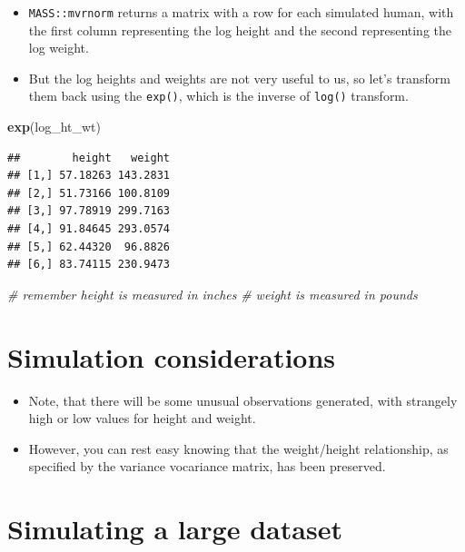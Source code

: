 \documentclass[
]{article}
\newenvironment{Shaded}{\begin{snugshade}}{\end{snugshade}}
\newcommand{\CommentTok}[1]{\textcolor[rgb]{0.56,0.35,0.01}{\textit{#1}}}
\newcommand{\FunctionTok}[1]{\textcolor[rgb]{0.13,0.29,0.53}{\textbf{#1}}}
\newcommand{\NormalTok}[1]{#1}
\providecommand{\tightlist}{%
  \setlength{\itemsep}{0pt}\setlength{\parskip}{0pt}}
\begin{document}
\begin{itemize}
\tightlist
\item
  \texttt{MASS::mvrnorm} returns a matrix with a row for each simulated
  human, with the first column representing the log height and the
  second representing the log weight.
\item
  But the log heights and weights are not very useful to us, so let's
  transform them back using the \texttt{exp()}, which is the inverse of
  \texttt{log()} transform.
\end{itemize}

\begin{Shaded}
\begin{Highlighting}[]
\FunctionTok{exp}\NormalTok{(log\_ht\_wt)}
\end{Highlighting}
\end{Shaded}

\begin{verbatim}
##        height   weight
## [1,] 57.18263 143.2831
## [2,] 51.73166 100.8109
## [3,] 97.78919 299.7163
## [4,] 91.84645 293.0574
## [5,] 62.44320  96.8826
## [6,] 83.74115 230.9473
\end{verbatim}

\begin{Shaded}
\begin{Highlighting}[]
\CommentTok{\# remember height is measured in inches}
\CommentTok{\# weight is measured in pounds}
\end{Highlighting}
\end{Shaded}

\hypertarget{simulation-considerations}{%
\section{Simulation considerations}\label{simulation-considerations}}

\begin{itemize}
\tightlist
\item
  Note, that there will be some unusual observations generated, with
  strangely high or low values for height and weight.
\item
  However, you can rest easy knowing that the weight/height
  relationship, as specified by the variance vocariance matrix, has been
  preserved.
\end{itemize}

\hypertarget{simulating-a-large-dataset}{%
\section{Simulating a large dataset}\label{simulating-a-large-dataset}}
\end{document}
